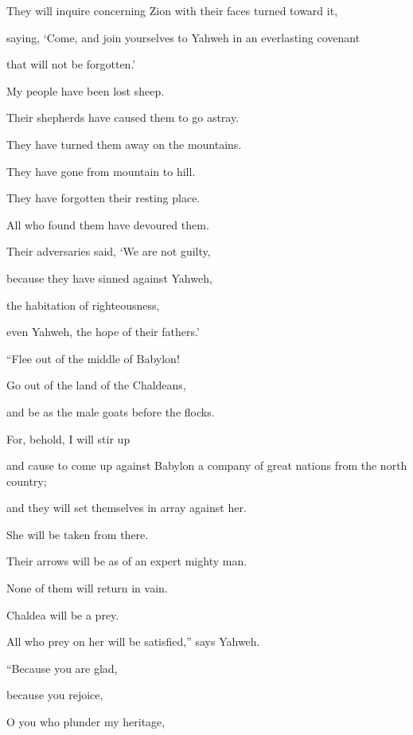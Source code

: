 {\par }{\Q {}They will inquire concerning Zion with their faces turned toward it,
\par }{\QB saying, ‘Come, and join yourselves to Yahweh in an everlasting covenant
\par }{\QB that will not be forgotten.’
\par }{\Q {}My people have been lost sheep.
\par }{\QB Their shepherds have caused them to go astray.
\par }{\Q They have turned them away on the mountains.
\par }{\QB They have gone from mountain to hill.
\par }{\QB They have forgotten their resting place.
\par }{\Q {}All who found them have devoured them.
\par }{\QB Their adversaries said, ‘We are not guilty,
\par }{\Q because they have sinned against Yahweh,
\par }{\QB the habitation of righteousness,
\par }{\QB even Yahweh, the hope of their fathers.’
\par }{\BB \par }{\Q {}“Flee out of the middle of Babylon!
\par }{\QB Go out of the land of the Chaldeans,
\par }{\QB and be as the male goats before the flocks.
\par }{\Q {}For, behold, I will stir up
\par }{\QB and cause to come up against Babylon a company of great nations from the north country;
\par }{\QB and they will set themselves in array against her.
\par }{\Q She will be taken from there.
\par }{\QB Their arrows will be as of an expert mighty man.
\par }{\QB None of them will return in vain.
\par }{\Q {}Chaldea will be a prey.
\par }{\QB All who prey on her will be satisfied,” says Yahweh.
\par }{\BB \par }{\Q {}“Because you are glad,
\par }{\QB because you rejoice,
\par }{\Q O you who plunder my heritage,
}
